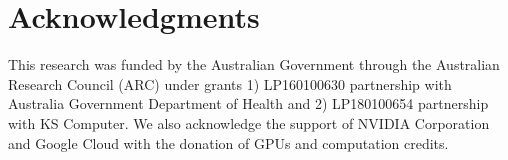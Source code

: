 \documentclass[letterpaper]{article} %
\begin{document}
\section{ Acknowledgments}
This research was funded by the Australian Government through the Australian Research Council (ARC) under grants 1) LP160100630 partnership with Australia Government Department of Health and 2) LP180100654 partnership with KS Computer. We also acknowledge the support of NVIDIA Corporation and Google Cloud with the donation of GPUs and computation credits.



\end{document}
